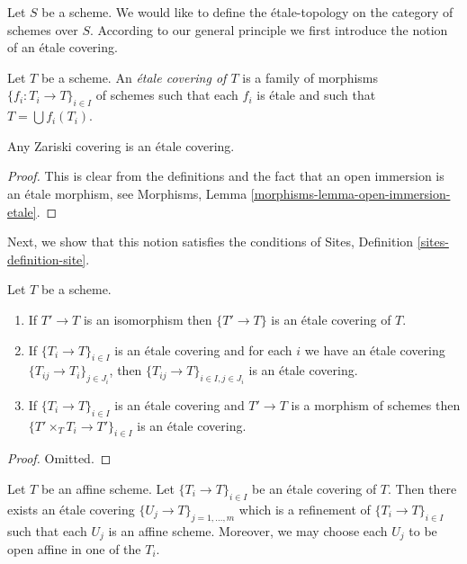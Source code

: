 \noindent
Let $S$ be a scheme. We would like to define the \'etale-topology on
the category of schemes over $S$. According to our general principle
we first introduce the notion of an \'etale covering.

\begin{definition}
\label{definition-etale-covering}
Let $T$ be a scheme. An {\it \'etale covering of $T$} is a family
of morphisms $\{f_i : T_i \to T\}_{i \in I}$ of schemes
such that each $f_i$ is \'etale and such that $T = \bigcup f_i(T_i)$.
\end{definition}

\begin{lemma}
\label{lemma-zariski-etale}
Any Zariski covering is an \'etale covering.
\end{lemma}

\begin{proof}
This is clear from the definitions and the fact that an open immersion
is an \'etale morphism, see
Morphisms, Lemma \ref{morphisms-lemma-open-immersion-etale}.
\end{proof}

\noindent
Next, we show that this notion satisfies the conditions of
Sites, Definition \ref{sites-definition-site}.

\begin{lemma}
\label{lemma-etale}
Let $T$ be a scheme.
\begin{enumerate}
\item If $T' \to T$ is an isomorphism then $\{T' \to T\}$
is an \'etale covering of $T$.
\item If $\{T_i \to T\}_{i\in I}$ is an \'etale covering and for each
$i$ we have an \'etale covering $\{T_{ij} \to T_i\}_{j\in J_i}$, then
$\{T_{ij} \to T\}_{i \in I, j\in J_i}$ is an \'etale covering.
\item If $\{T_i \to T\}_{i\in I}$ is an \'etale covering
and $T' \to T$ is a morphism of schemes then
$\{T' \times_T T_i \to T'\}_{i\in I}$ is an \'etale covering.
\end{enumerate}
\end{lemma}

\begin{proof}
Omitted.
\end{proof}

\begin{lemma}
\label{lemma-etale-affine}
Let $T$ be an affine scheme.
Let $\{T_i \to T\}_{i \in I}$ be an \'etale covering of $T$.
Then there exists an \'etale covering
$\{U_j \to T\}_{j = 1, \ldots, m}$ which is a refinement
of $\{T_i \to T\}_{i \in I}$ such that each $U_j$ is an affine
scheme. Moreover, we may choose each $U_j$ to be open affine
in one of the $T_i$.
\end{lemma}

